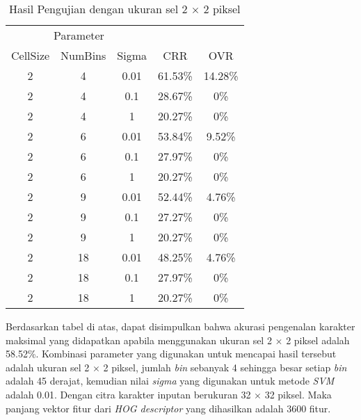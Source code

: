 \begin{longtable}[c]{|c|c|c|c|c|}
	\caption{Hasil Pengujian dengan ukuran sel 2 $\times$ 2 piksel}
	\label{tab:HasilPengujianSel2}\\
	\hline
	\multicolumn{3}{|c|}{Parameter} &                                &                                \\ \cline{1-3}
	CellSize   & NumBins   & Sigma  & \multirow{-2}{*}{CRR}          & \multirow{-2}{*}{OVR}          \\ \hline
	\endhead
	2          & 4         & 0.01   & {\color[HTML]{FE0000} 61.53\%} & {\color[HTML]{FE0000} 14.28\%} \\ \hline
	2          & 4         & 0.1    & 28.67\%                        & 0\%                            \\ \hline
	2          & 4         & 1      & 20.27\%                        & 0\%                            \\ \hline
	2          & 6         & 0.01   & 53.84\%                           & 9.52\%                         \\ \hline
	2          & 6         & 0.1    & 27.97\%                        & 0\%                            \\ \hline
	2          & 6         & 1      & 20.27\%                        & 0\%                            \\ \hline
	2          & 9         & 0.01   & 52.44\%                        & 4.76\%                         \\ \hline
	2          & 9         & 0.1    & 27.27\%                           & 0\%                            \\ \hline
	2          & 9         & 1      & 20.27\%                        & 0\%                            \\ \hline
	2          & 18        & 0.01   & 48.25\%                        & 4.76\%                         \\ \hline
	2          & 18        & 0.1    & 27.97\%                           & 0\%                            \\ \hline
	2          & 18        & 1      & 20.27\%                        & 0\%                            \\ \hline
\end{longtable}
\noindent Berdasarkan tabel di atas, dapat disimpulkan bahwa akurasi pengenalan karakter maksimal yang didapatkan apabila menggunakan ukuran sel 2 $\times$ 2 piksel adalah 58.52\%. Kombinasi parameter yang digunakan untuk mencapai hasil tersebut adalah ukuran sel 2 $\times$ 2 piksel, jumlah \textit{bin} sebanyak 4 sehingga besar setiap \textit{bin} adalah 45 derajat, kemudian nilai \textit{sigma} yang digunakan untuk metode \textit{SVM} adalah 0.01. Dengan citra karakter inputan berukuran 32 $\times$ 32 piksel. Maka panjang vektor fitur dari \textit{HOG descriptor} yang dihasilkan adalah 3600 fitur.
 
